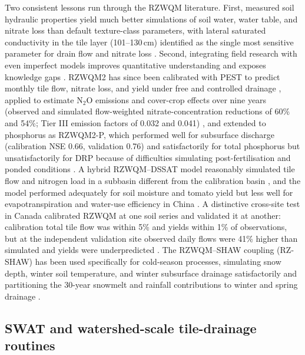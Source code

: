 \documentclass[11pt]{article}
\begin{document}
Two consistent lessons run through the RZWQM literature. First, measured soil hydraulic properties yield much better simulations of soil water, water table, and nitrate loss than default texture-class parameters, with lateral saturated conductivity in the tile layer (101--130\,cm) identified as the single most sensitive parameter for drain flow and nitrate loss \parencite{Ma2007c,Ahuja2007}. Second, integrating field research with even imperfect models improves quantitative understanding and exposes knowledge gaps \parencite{Ahuja2007}. RZWQM2 has since been calibrated with PEST to predict monthly tile flow, nitrate loss, and yield under free and controlled drainage \parencite{Fang2012}, applied to estimate N$_2$O emissions and cover-crop effects over nine years (observed and simulated flow-weighted nitrate-concentration reductions of 60\% and 54\%; Tier III emission factors of 0.032 and 0.041) \parencite{Gillette2018}, and extended to phosphorus as RZWQM2-P, which performed well for subsurface discharge (calibration NSE 0.66, validation 0.76) and satisfactorily for total phosphorus but unsatisfactorily for DRP because of difficulties simulating post-fertilisation and ponded conditions \parencite{BinShokrana2023b}. A hybrid RZWQM--DSSAT model reasonably simulated tile flow and nitrogen load in a subbasin different from the calibration basin \parencite{Singer2011}, and the model performed adequately for soil moisture and tomato yield but less well for evapotranspiration and water-use efficiency in China \parencite{Zhang2022b}. A distinctive cross-site test in Canada calibrated RZWQM at one soil series and validated it at another: calibration total tile flow was within 5\% and yields within 1\% of observations, but at the independent validation site observed daily flows were 41\% higher than simulated and yields were underpredicted \parencite{Ahmed2007}. The RZWQM--SHAW coupling (RZ-SHAW) has been used specifically for cold-season processes, simulating snow depth, winter soil temperature, and winter subsurface drainage satisfactorily and partitioning the 30-year snowmelt and rainfall contributions to winter and spring drainage \parencite{Li2024b,Li2025}.

\subsection{SWAT and watershed-scale tile-drainage routines}
\end{document}

